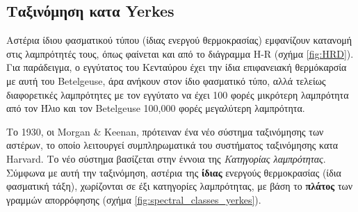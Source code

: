 \subsection{Ταξινόμηση κατα Yerkes}
Αστέρια ίδιου φασματικού τύπου (ίδιας ενεργού θερμοκρασίας) εμφανίζουν κατανομή στις λαμπρότητές τους, όπως φαίνεται και από το διάγραμμα H-R (σχήμα \ref{fig:HRD}). Για παράδειγμα, ο εγγύτατος του Κενταύρου έχει την ίδια επιφανειακή θερμόκαρσία με αυτή του Betelgeuse, άρα ανήκουν στον ίδιο φασματικό τύπο, αλλά τελείως διαφορετικές λαμπρότητες με τον εγγύτατο να έχει 100 φορές μικρότερη λαμπρότητα από τον Ήλιο και τον Betelgeuse 100,000 φορές μεγαλύτερη λαμπρότητα.

Το 1930, οι Morgan \& Keenan, πρότειναν ένα νέο σύστημα ταξινόμησης των αστέρων, το οποίο λειτουργεί συμπληρωματικά του συστήματος ταξινόμησης κατα Harvard. Το νέο σύστημα βασίζεται στην έννοια της \textit{Κατηγορίας λαμπρότητας}. Σύμφωνα με αυτή την ταξινόμηση, αστέρια της \textbf{ίδιας} ενεργούς θερμοκρασίας (ίδια φασματική τάξη), χωρίζονται σε έξι κατηγορίες λαμπρότητας, με βάση το \textbf{πλάτος} των γραμμών απορρόφησης (σχήμα \ref{fig:spectral_classes_yerkes}).


